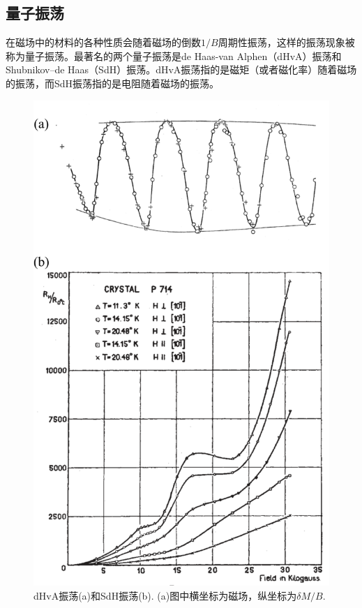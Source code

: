 \subsection{量子振荡}

在磁场中的材料的各种性质会随着磁场的倒数$1/B$周期性振荡，这样的振荡现象被称为量子振荡。最著名的两个量子振荡是de Haas-van Alphen（dHvA）振荡\cite{dHvA}和Shubnikov–de Haas（SdH）振荡\cite{SdH}。dHvA振荡指的是磁矩（或者磁化率）随着磁场的振荡，而SdH振荡指的是电阻随着磁场的振荡。

\begin{figure}
	\includegraphics[width=1.0\textwidth]{../figures/quantum-oscillation.png}
	\caption{dHvA振荡(a)和SdH振荡(b). (a)图中横坐标为磁场，纵坐标为$\delta M/B$.\label{quantum-oscillation}}
\end{figure}

